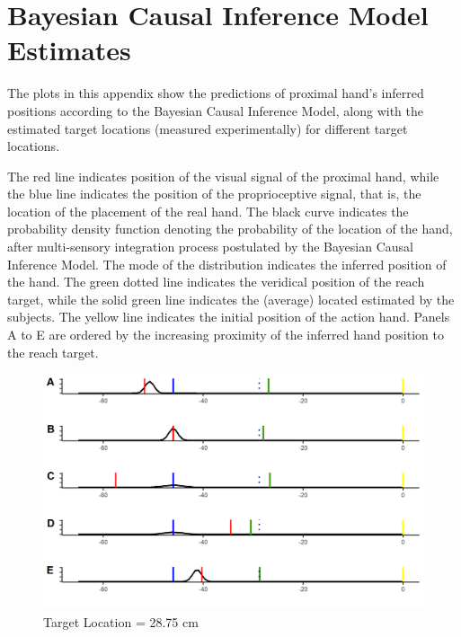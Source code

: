 \chapter{Bayesian Causal Inference Model Estimates} 
\label{App-bci-plots} 

The plots in this appendix show the predictions of proximal hand's inferred positions according to the Bayesian Causal Inference Model, along with the estimated target locations (measured experimentally) for different target locations.

The red line indicates position of the visual signal of the proximal hand, while the blue line indicates the position of the proprioceptive signal, that is, the location of the placement of the real hand. The black curve indicates the probability density function denoting the probability of the location of the hand, after multi-sensory integration process postulated by the Bayesian Causal Inference Model. The mode of the distribution indicates the inferred position of the hand. The green dotted line indicates the veridical position of the reach target, while the solid green line indicates the (average) located estimated by the subjects. The yellow line indicates the initial position of the action hand. Panels A to E are ordered by the increasing proximity of the inferred hand position to the reach target.


\begin{figure}[h]
\centering       
    \includegraphics[width=\textwidth, keepaspectratio]{Images/bci-plots/bci_plot17-25.png}
    \caption{Target Location = 28.75 cm}
    \label{}
\end{figure}

